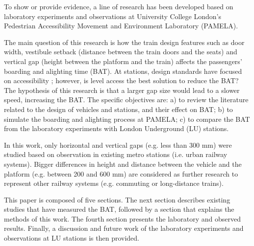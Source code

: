 To show or provide evidence, a line of research has been developed based on laboratory experiments and observations at University College London’s Pedestrian Accessibility Movement and Environment Laboratory (PAMELA).

The main question of this research is how the train design features such as door width, vestibule setback (distance between the train doors and the seats) and vertical gap (height between the platform and the train) affects the passengers’ boarding and alighting time (BAT). At stations, design standards have focused on accessibility \cite{Ref6}; however, is level access the best solution to reduce the BAT? The hypothesis of this research is that a larger gap size would lead to a slower speed, increasing the BAT. The specific objectives are: a) to review the literature related to the design of vehicles and stations, and their effect on BAT; b) to simulate the boarding and alighting process at PAMELA; c) to compare the BAT from the laboratory experiments with London Underground (LU) stations.

In this work, only horizontal and vertical gaps (e.g. less than 300 mm) were studied based on observation in existing metro stations (i.e. urban railway systems). Bigger differences in height and distance between the vehicle and the platform (e.g. between 200 and 600 mm) are considered as further research to represent other railway systems (e.g. commuting or long-distance trains).

This paper is composed of five sections. The next section describes existing studies that have measured the BAT, followed by a section that explains the methods of this work.  The fourth section presents the laboratory and observed results. Finally, a discussion and future work of the laboratory experiments and observations at LU stations is then provided.
